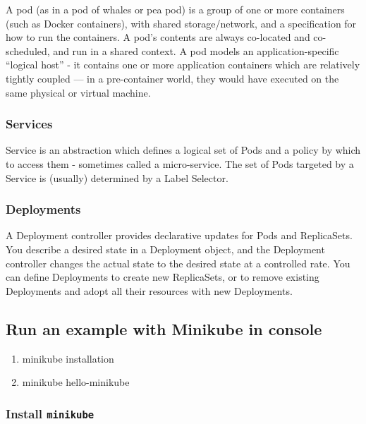 A pod (as in a pod of whales or pea pod) is a group of one or more
containers (such as Docker containers), with shared storage/network, and
a specification for how to run the containers. A pod's contents are
always co-located and co-scheduled, and run in a shared context. A pod
models an application-specific ``logical host'' - it contains one or
more application containers which are relatively tightly coupled --- in
a pre-container world, they would have executed on the same physical or
virtual machine.

\subsubsection{Services}\label{services}

Service is an abstraction which defines a logical set of Pods and a
policy by which to access them - sometimes called a micro-service. The
set of Pods targeted by a Service is (usually) determined by a Label
Selector.

\subsubsection{Deployments}\label{deployments}

A Deployment controller provides declarative updates for Pods and
ReplicaSets. You describe a desired state in a Deployment object, and
the Deployment controller changes the actual state to the desired state
at a controlled rate. You can define Deployments to create new
ReplicaSets, or to remove existing Deployments and adopt all their
resources with new Deployments.

\subsection{Run an example with Minikube in
console}\label{run-an-example-with-minikube-in-console}

\begin{enumerate}
\item
  minikube installation
\item
  minikube hello-minikube
\end{enumerate}

\subsubsection{\texorpdfstring{Install
\texttt{minikube}}{Install minikube}}\label{install-minikube}

